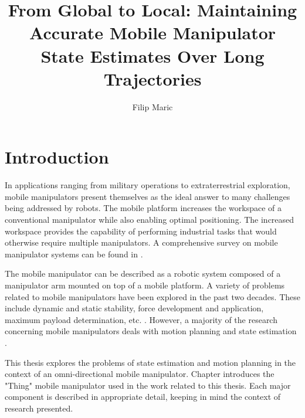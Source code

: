 \documentclass[times, utf8, diplomski, english]{fer}
\begin{document}

\title{From Global to Local: Maintaining Accurate Mobile Manipulator State Estimates Over Long Trajectories}

\author{Filip Maric}

\maketitle

\izvornik


\tableofcontents

\chapter{Introduction}
In applications ranging from military operations to extraterrestrial exploration, mobile manipulators present themselves as the ideal answer to many challenges being addressed by robots.
The mobile platform increases the workspace of a conventional manipulator while also enabling optimal positioning.
The increased workspace provides the capability of performing industrial tasks that would otherwise require multiple manipulators.
A comprehensive survey on mobile manipulator systems can be found in \citep{bloch2003nonholonomic}.

The mobile manipulator can be described as a robotic system composed of a manipulator arm mounted on top of a mobile platform.
A variety of problems related to mobile manipulators have been explored in the past two decades. 
These include dynamic and static stability, force development and application, maximum payload determination, etc. \citep{papadopoulos1999framework,korayem2004analysis}.
However, a majority of the research concerning mobile manipulators deals with motion planning and state estimation \citep{yamamoto1992coordinating,korayem2012mathematical}.
 
This thesis explores the problems of state estimation and motion planning in the context of an omni-directional mobile manipulator.
Chapter  introduces the "Thing" mobile manipulator used in the work related to this thesis.
Each major component is described in appropriate detail, keeping in mind the context of research presented.
\end{document}
